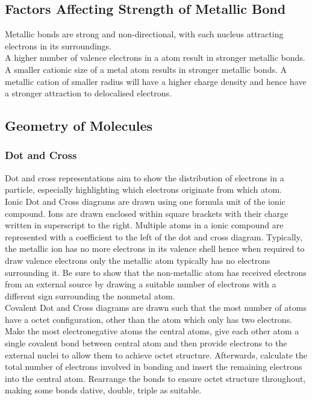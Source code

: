 \documentclass[../main]{subfiles}
\begin{document}
	\subsection{Factors Affecting Strength of Metallic Bond}

	Metallic bonds are strong and non-directional, with each nucleus attracting electrons in its surroundings. \\

	A higher number of valence electrons in a atom result in stronger metallic bonds.\\

	A smaller cationic size of a metal atom results in stronger metallic bonds. A metallic cation of smaller radius will have a higher charge density and hence have a stronger attraction to delocalised electrons.\\

	\subsection{Geometry of Molecules}

	\subsubsection{Dot and Cross}

	Dot and cross representations aim to show the distribution of electrons in a particle, especially highlighting which electrons originate from which atom. \\

	Ionic Dot and Cross diagrams are drawn using one formula unit of the ionic compound. Ions are drawn enclosed within square brackets with their charge written in superscript to the right. Multiple atoms in a ionic compound are represented with a coefficient to the left of the dot and cross diagram. Typically, the metallic ion has no more electrons in its valence shell hence when required to draw valence electrons only the metallic atom typically has no electrons surrounding it. Be sure to show that the non-metallic atom has received electrons from an external source by drawing a suitable number of electrons with a different sign surrounding the nonmetal atom. \\

	Covalent Dot and Cross diagrams are drawn such that the most number of atoms have a octet configuration, other than the  atom which only has two electrons. Make the most electronegative atoms the central atoms, give each other atom a single covalent bond between central atom and then provide electrons to the external nuclei to allow them to achieve octet structure. Afterwards, calculate the total number of electrons involved in bonding and insert the remaining electrons into the central atom. Rearrange the bonds to ensure octet structure throughout, making some bonds dative, double, triple as suitable.\\
\end{document}
